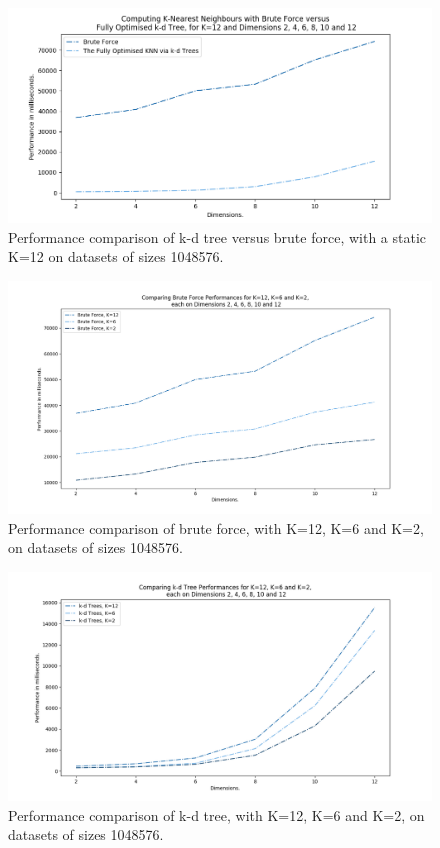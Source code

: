 \begin{figure}[H]
\centering
\includegraphics[width=1\textwidth]{pics/plot-figs/new-brute-k12-lines.png}
\caption{Performance comparison of k-d tree versus brute force, with a static K=12 on datasets of sizes 1048576.}
\label{fig:b4}
\end{figure}



\begin{figure}[H]
\centering
\includegraphics[width=1\textwidth]{pics/plot-figs/brute-k2k6k12.png}
\caption{Performance comparison of brute force, with K=12, K=6 and K=2, on datasets of sizes 1048576.}
\label{fig:b6}
\end{figure}


\begin{figure}[H]
\centering
\includegraphics[width=1\textwidth]{pics/plot-figs/kdtree-k2k6k12.png}
\caption{Performance comparison of k-d tree, with K=12, K=6 and K=2, on datasets of sizes 1048576.}
\label{fig:b7}
\end{figure}


